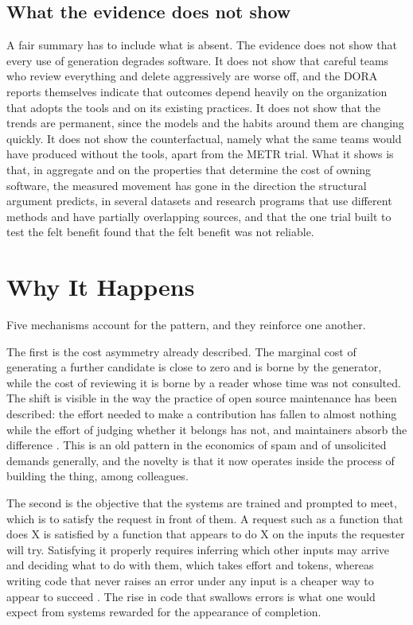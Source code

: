 \documentclass[11pt,a4paper]{article}
\theoremstyle{remark}
\begin{document}
\subsection{What the evidence does not show}

A fair summary has to include what is absent. The evidence does not show that every use of generation degrades software. It does not show that careful teams who review everything and delete aggressively are worse off, and the DORA reports themselves indicate that outcomes depend heavily on the organization that adopts the tools and on its existing practices. It does not show that the trends are permanent, since the models and the habits around them are changing quickly. It does not show the counterfactual, namely what the same teams would have produced without the tools, apart from the METR trial. What it shows is that, in aggregate and on the properties that determine the cost of owning software, the measured movement has gone in the direction the structural argument predicts, in several datasets and research programs that use different methods and have partially overlapping sources, and that the one trial built to test the felt benefit found that the felt benefit was not reliable.

\section{Why It Happens}

Five mechanisms account for the pattern, and they reinforce one another.

The first is the cost asymmetry already described. The marginal cost of generating a further candidate is close to zero and is borne by the generator, while the cost of reviewing it is borne by a reader whose time was not consulted. The shift is visible in the way the practice of open source maintenance has been described: the effort needed to make a contribution has fallen to almost nothing while the effort of judging whether it belongs has not, and maintainers absorb the difference \cite{Slop2026Dev}. This is an old pattern in the economics of spam and of unsolicited demands generally, and the novelty is that it now operates inside the process of building the thing, among colleagues.

The second is the objective that the systems are trained and prompted to meet, which is to satisfy the request in front of them. A request such as a function that does X is satisfied by a function that appears to do X on the inputs the requester will try. Satisfying it properly requires inferring which other inputs may arrive and deciding what to do with them, which takes effort and tokens, whereas writing code that never raises an error under any input is a cheaper way to appear to succeed \cite{LeadDev2026}. The rise in code that swallows errors is what one would expect from systems rewarded for the appearance of completion.
\end{document}
